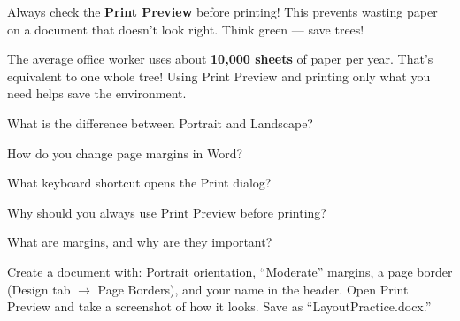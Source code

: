 \begin{notebox}
Always check the \textbf{Print Preview} before printing! This prevents wasting paper on a document that doesn't look right. Think green --- save trees! \faTree
\end{notebox}


\begin{funfact}
The average office worker uses about \textbf{10,000 sheets} of paper per year. That's equivalent to one whole tree! Using Print Preview and printing only what you need helps save the environment.
\end{funfact}

\begin{reviewqs}
  \item What is the difference between Portrait and Landscape?
  \item How do you change page margins in Word?
  \item What keyboard shortcut opens the Print dialog?
  \item Why should you always use Print Preview before printing?
  \item What are margins, and why are they important?
\end{reviewqs}

\begin{challenge}
Create a document with: Portrait orientation, ``Moderate'' margins, a page border (Design tab $\rightarrow$ Page Borders), and your name in the header. Open Print Preview and take a screenshot of how it looks. Save as ``LayoutPractice.docx.''
\end{challenge}
